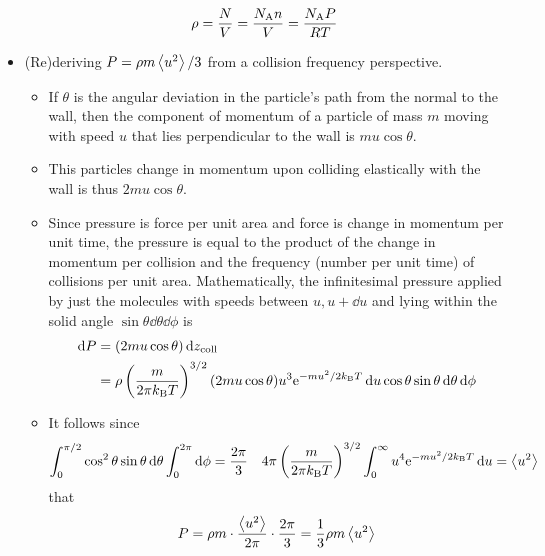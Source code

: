 \documentclass[../notes.tex]{subfiles}
\begin{document}
\begin{itemize}
    \begin{equation*}
        \rho = \frac{N}{V}
        = \frac{\NA n}{V}
        = \frac{\NA P}{RT}
    \end{equation*}
    \item (Re)deriving $P=\rho m\prb{u^2}/3$ from a collision frequency perspective.
    \begin{itemize}
        \item If $\theta$ is the angular deviation in the particle's path from the normal to the wall, then the component of momentum of a particle of mass $m$ moving with speed $u$ that lies perpendicular to the wall is $mu\cos\theta$.
        \item This particles change in momentum upon colliding elastically with the wall is thus $2mu\cos\theta$.
        \item Since pressure is force per unit area and force is change in momentum per unit time, the pressure is equal to the product of the change in momentum per collision and the frequency (number per unit time) of collisions per unit area. Mathematically, the infinitesimal pressure applied by just the molecules with speeds between $u,u+\dd{u}$ and lying within the solid angle $\sin\theta\dd{\theta}\dd{\phi}$ is
        \begin{align*}
            \dd{P} &= (2mu\cos\theta)\dd{z_\text{coll}}\\
            &= \rho\left( \frac{m}{2\pi\kB T} \right)^{3/2}(2mu\cos\theta)u^3\e[-mu^2/2\kB T]\dd{u}\cos\theta\sin\theta\dd{\theta}\dd{\phi}
        \end{align*}
        \item It follows since
        \begin{align*}
            \int_0^{\pi/2}\cos^2\theta\sin\theta\dd{\theta}\int_0^{2\pi}\dd{\phi} &= \frac{2\pi}{3}&
            4\pi\left( \frac{m}{2\pi\kB T} \right)^{3/2}\int_0^\infty u^4\e[-mu^2/2\kB T]\dd{u} &= \prb{u^2}
        \end{align*}
        that
        \begin{equation*}
            P = \rho m\cdot\frac{\prb{u^2}}{2\pi}\cdot\frac{2\pi}{3}
            = \frac{1}{3}\rho m\prb{u^2}
        \end{equation*}
    \end{itemize}
\end{itemize}
\end{document}
